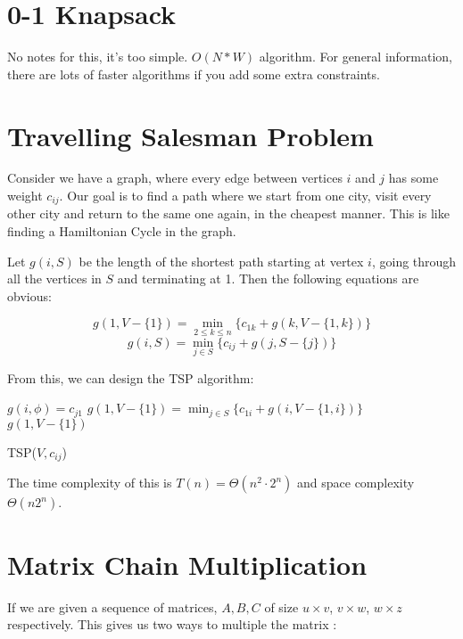 \documentclass[12pt,letterpaper]{article}
\theoremstyle{definition}
\begin{document}
\section{0-1 Knapsack}

No notes for this, it's too simple. $O(N*W)$ algorithm. For general information, there are lots of faster algorithms if you add some extra constraints.

\section{Travelling Salesman Problem}

Consider we have a graph, where every edge between vertices $i$ and $j$ has some weight $c_{ij}$. Our goal is to find a path where we start from one city, visit every other city and return to the same one again, in the cheapest manner. This is like finding a Hamiltonian Cycle in the graph.

Let $g(i,S)$ be the length of the shortest path starting at vertex $i$, going through all the vertices in $S$ and terminating at 1. Then the following equations are obvious:

\[g(1,V-\{1\}) = \min_{2 \leq k \leq n} \{c_{1k} + g(k,V-\{1,k\})\}\]
\[g(i,S) = \min_{j \in S} \{c_{ij} + g(j,S-\{j\})\}\]

From this, we can design the TSP algorithm:

\begin{algorithm}[H]
  \SetAlgoLined
   {
    $g(i,\phi) = c_{j1}$
  }
  $g(1,V-\{1\}) = \min_{j \in S} \{c_{1i} + g(i,V-\{1,i\})\}$ \\
  \Return $g(1,V-\{1\})$
  \caption{TSP($V,c_{ij}$)}
\end{algorithm}

The time complexity of this is $T(n) = \Theta(n^2 \cdot 2^n)$ and space complexity $\Theta(n2^n)$.

\section{Matrix Chain Multiplication}

If we are given a sequence of matrices, $A,B,C$ of size $u \times v$, $v \times w$, $w \times z$ respectively. This gives us two ways to multiple the matrix : 
\end{document}
